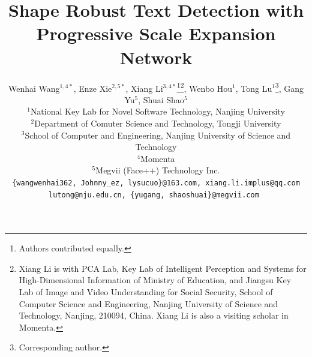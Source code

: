 \documentclass[10pt,twocolumn,letterpaper]{article}
\begin{document}
\title{Shape Robust Text Detection with Progressive Scale Expansion Network}

\author{Wenhai Wang$^{1,4*}$, Enze Xie$^{2,5*}$, Xiang Li$^{3,4*}$\thanks{Authors contributed equally.}\thanks{Xiang Li is with PCA Lab, Key Lab of Intelligent Perception and Systems for High-Dimensional Information of Ministry of Education, and Jiangsu Key Lab of Image and Video Understanding for Social Security, School of Computer Science and Engineering, Nanjing University of Science and Technology, Nanjing, 210094, China. Xiang Li is also a visiting scholar in Momenta.},  Wenbo Hou$^{1}$, Tong Lu$^{1}$\thanks{Corresponding author.}, Gang Yu$^{5}$, Shuai Shao$^{5}$\\
${^1}$National Key Lab for Novel Software Technology, Nanjing University\\
${^2}$Department of Comuter Science and Technology, Tongji University\\
${^3}$School of Computer and Engineering, Nanjing University of Science and Technology\\
${^4}$Momenta \\
${^5}$Megvii (Face++) Technology Inc.\\
\tt\small\{wangwenhai362, Johnny\_ez, lysucuo\}@163.com, xiang.li.implus@qq.com\\
\tt\small lutong@nju.edu.cn, \{yugang, shaoshuai\}@megvii.com
}

\maketitle
\end{document}
